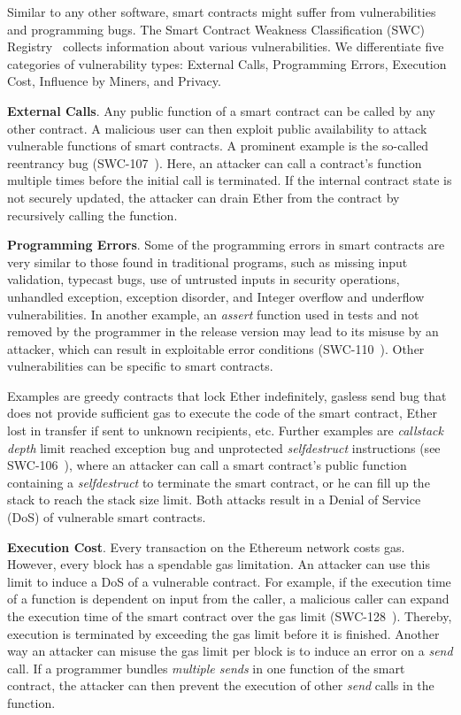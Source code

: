 Similar to any other software, smart contracts might suffer from vulnerabilities and programming bugs. 
The Smart Contract Weakness Classification (SWC) Registry~\cite{swcregistry} collects information about various vulnerabilities. 
We differentiate five categories of vulnerability types: External Calls, Programming Errors, Execution Cost, Influence by Miners, and Privacy. 

\textbf{External Calls}. Any public function of a smart contract can be called by any other contract. A malicious user can then exploit public availability to attack vulnerable functions of smart contracts. A prominent example is the so-called reentrancy bug (SWC-107~\cite{swcregistry}). Here, an attacker can call a contract's function multiple times before the initial call is terminated. If the internal contract state is not securely updated, the attacker can drain Ether from the contract by recursively calling the function.

\textbf{Programming Errors}.
Some of the programming errors in smart contracts are very similar to those found in traditional programs,
such as missing input validation, typecast bugs, use of untrusted inputs in security operations, unhandled exception, exception disorder, and Integer overflow and underflow vulnerabilities. In another example, an \textit{assert} function used in tests and not removed by the programmer in the release version may lead to its misuse by an attacker, which can result in exploitable error conditions (SWC-110~\cite{swcregistry}). Other vulnerabilities can be specific to smart contracts.

Examples are greedy contracts that lock Ether indefinitely, gasless send bug that does not provide sufficient gas to execute the code of the smart contract, Ether lost in transfer if sent to unknown recipients, etc. 
Further examples are \textit{callstack depth} 
limit reached exception bug and unprotected \textit{selfdestruct} instructions (see SWC-106~\cite{swcregistry}), where an
attacker can call a smart contract's public function containing a \textit{selfdestruct} to terminate the smart contract, or he can fill up the stack to reach the stack size limit. Both attacks result in a Denial of Service (DoS) of vulnerable smart contracts.

\textbf{Execution Cost}. Every transaction on the Ethereum network costs gas. However, every block has a spendable gas limitation. An attacker can use this limit to induce a DoS of a vulnerable contract. For example, if the execution time of a function is dependent on input from the caller, a malicious caller can expand the execution time of the smart contract over the gas limit (SWC-128~\cite{swcregistry}). Thereby, execution is terminated by exceeding the gas limit before it is finished. Another way an attacker can misuse the gas limit per block is to induce an error on a \textit{send} call. If a programmer bundles \textit{multiple sends} in one function of the smart contract, the attacker can then prevent the execution of other \textit{send} calls in the function.

